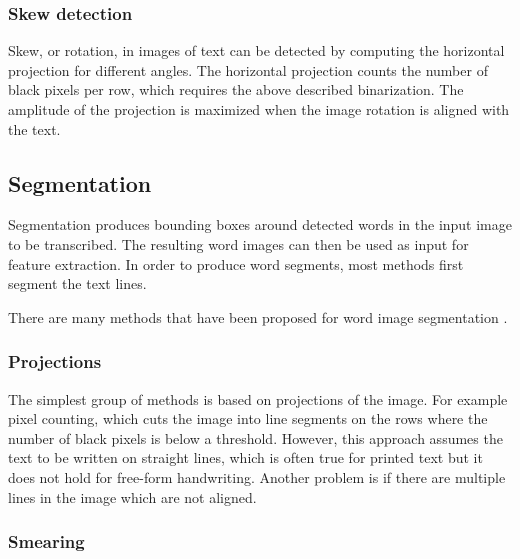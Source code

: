 \subsubsection{Skew detection}

Skew, or rotation, in images of text can be detected by computing the horizontal projection for different angles. The horizontal projection counts the number of black pixels per row, which requires the above described binarization. The amplitude of the projection is maximized when the image rotation is aligned with the text.

%
%

\subsection{Segmentation}

Segmentation produces bounding boxes around detected words in the input image to be transcribed. The resulting word images can then be used as input for feature extraction. In order to produce word segments, most methods first segment the text lines.

There are many methods that have been proposed for word image segmentation \cite{HWR_survey, Waterflow2011, Waterflow2015}.

\subsubsection{Projections}

The simplest group of methods is based on projections of the image. For example pixel counting, which cuts the image into line segments on the rows where the number of black pixels is below a threshold. However, this approach assumes the text to be written on straight lines, which is often true for printed text but it does not hold for free-form handwriting. Another problem is if there are multiple lines in the image which are not aligned.

\subsubsection{Smearing}

